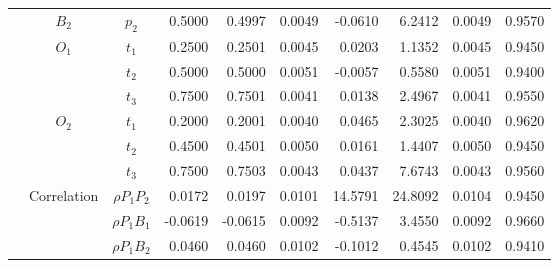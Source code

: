 \documentclass[letterpaper]{article}
\begin{document}
\begin{table}[h]
\begin{tabular}{cccrrrrrrr}
            & $B_2$       & $p_2$          & 0.5000                 & 0.4997                 & 0.0049                 & -0.0610                & 6.2412                 & 0.0049                   & 0.9570                 \\
            & $O_1$       & $t_1$          & 0.2500                 & 0.2501                 & 0.0045                 & 0.0203                 & 1.1352                 & 0.0045                   & 0.9450                 \\
            &             & $t_2$          & 0.5000                 & 0.5000                 & 0.0051                 & -0.0057                & 0.5580                 & 0.0051                   & 0.9400                 \\
            &             & $t_3$          & 0.7500                 & 0.7501                 & 0.0041                 & 0.0138                 & 2.4967                 & 0.0041                   & 0.9550                 \\
            & $O_2$       & $t_1$          & 0.2000                 & 0.2001                 & 0.0040                 & 0.0465                 & 2.3025                 & 0.0040                   & 0.9620                 \\
            &             & $t_2$          & 0.4500                 & 0.4501                 & 0.0050                 & 0.0161                 & 1.4407                 & 0.0050                   & 0.9450                 \\
            &             & $t_3$          & 0.7500                 & 0.7503                 & 0.0043                 & 0.0437                 & 7.6743                 & 0.0043                   & 0.9560                 \\
            & Correlation & $\rho{P_1P_2}$ & 0.0172                 & 0.0197                 & 0.0101                 & 14.5791                & 24.8092                & 0.0104                   & 0.9450                 \\
            &             & $\rho{P_1B_1}$ & -0.0619                & -0.0615                & 0.0092                 & -0.5137                & 3.4550                 & 0.0092                   & 0.9660                 \\
            &             & $\rho{P_1B_2}$ & 0.0460                 & 0.0460                 & 0.0102                 & -0.1012                & 0.4545                 & 0.0102                   & 0.9410                 \\

\end{tabular}
\end{table}
\end{document}
